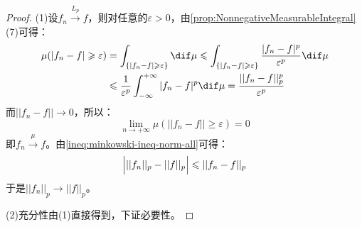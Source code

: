 \begin{proof}
	(1)设$f_n\overset{L_p}{\longrightarrow}f$，则对任意的$\varepsilon>0$，由\cref{prop:NonnegativeMeasurableIntegral}(7)可得：
	\begin{align*}
		\mu(|f_n-f|\geqslant\varepsilon)
		&=\int_{\{|f_n-f|\geqslant\varepsilon\}}^{}\dif\mu\leqslant\int_{\{|f_n-f|\geqslant\varepsilon\}}^{}\frac{|f_n-f|^p}{\varepsilon^p}\dif\mu \\
		&\leqslant\frac{1}{\varepsilon^p}\int_{-\infty}^{+\infty}|f_n-f|^p\dif\mu=\frac{||f_n-f||^p_p}{\varepsilon^p}
	\end{align*}
	而$||f_n-f||\to0$，所以：
	\begin{equation*}
		\lim_{n\to+\infty}\mu(||f_n-f||\geqslant\varepsilon)=0
	\end{equation*}
	即$f_n\overset{\mu}{\longrightarrow}f$。由\cref{ineq:minkowski-ineq-norm-all}可得：
	\begin{equation*}
		\Bigl|||f_n||_p-||f||_p\Bigr|\leqslant||f_n-f||_p
	\end{equation*}
	于是$||f_n||_p\to||f||_p$。\par
	(2)充分性由(1)直接得到，下证必要性。
\end{proof}